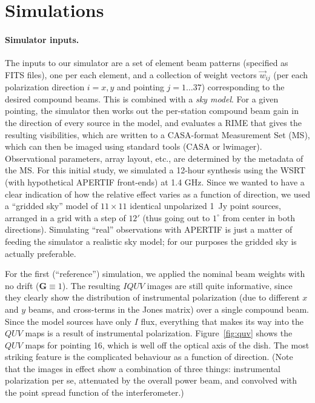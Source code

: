 \documentclass{aps2010} \special{papersize=8.5in,11in}
\begin{document}
\section{Simulations}

\paragraph*{Simulator inputs.} The inputs to our simulator are a set of element beam patterns (specified as FITS files), one per each element, 
and a collection of weight vectors $\vec w_{ij}$ (per each polarization direction $i=x,y$ and pointing $j=1\ldots37$) corresponding to the desired compound beams. This is combined with a {\em sky model}. For a given pointing, the simulator then works out the per-station compound beam gain in the direction of every source in the model, and evaluates a RIME that gives the resulting visibilities, which are written to a CASA-format Measurement Set (MS), which can then be imaged using standard tools (CASA or lwimager). Observational parameters, array layout, etc., are determined by the metadata of the MS. For this initial study, we simulated a 12-hour synthesis using the WSRT (with hypothetical APERTIF front-ends) at 1.4 GHz. Since we wanted to have a clear indication of how the relative effect varies as a function of direction, we used a ``gridded sky'' model of $11\times11$ identical unpolarized 1~Jy point sources, arranged in a grid with a step of $12'$ (thus going out to $1^\circ$ from center in both directions). Simulating ``real'' observations with APERTIF is just a matter of feeding the simulator a realistic sky model; for our purposes the gridded sky is actually preferable.

For the first (``reference'') simulation, we applied the nominal beam weights with no drift ($\mathbf{G}\equiv1$). The resulting $IQUV$ images are still quite informative, since they clearly show the distribution of instrumental polarization (due to different $x$ and $y$ beams, and cross-terms in the Jones matrix) over a single compound beam. Since the model sources have only $I$ flux, everything that makes its way into the $QUV$ maps is a result of instrumental polarization. Figure~\ref{fig:quv} shows the $QUV$ maps for pointing 16, which is well off the optical axis of the dish. The most striking feature is the complicated behaviour as a function of direction. (Note that the images in effect show a combination of three things: instrumental polarization per se, attenuated by the overall power beam, and convolved with the point spread function of the interferometer.) 
\end{document}
